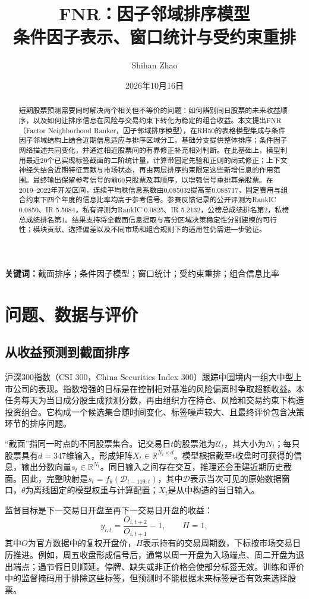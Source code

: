 \documentclass[UTF8,11pt,a4paper,fontset=fandol]{ctexart}
\title{\bfseries FNR：因子邻域排序模型\\[0.35em]\large 条件因子表示、窗口统计与受约束重排}
\author{Shihan Zhao}
\date{2026年10月16日}
\makeatletter
\renewcommand{\maketitle}{%
  \thispagestyle{plain}%
  \begin{center}
    {\LARGE\@title\par}\vspace{.65em}
    {\normalsize\@author\par}\vspace{.35em}
    {\small\@date\par}
  \end{center}\vspace{.5em}%
}
\newcommand{\R}{\mathbb{R}}
\makeatother
\begin{document}
\maketitle
\begin{abstract}
短期股票预测需要同时解决两个相关但不等价的问题：如何辨别同日股票的未来收益顺序，以及如何让排序信息在风险与交易约束下转化为稳定的组合收益。本文提出FNR（Factor Neighborhood Ranker，因子邻域排序模型），在RH50的表格模型集成与条件因子邻域结构上结合近期信息适应与排序区域分工。基础分支提供整体排序；条件因子网络描述共同变化，并通过相近股票间的有界修正补充相对判断。在此基础上，模型利用最近20个已实现标签截面的二阶统计量，计算带固定先验和正则的闭式修正；上下文神经头结合近期特征贡献与市场状态，再由两层排序约束限定这些新增信息的作用范围。最终输出保留参考信号的前60只股票及其顺序，以增强信号重排其余股票。在2019--2022年开发区间，连续平均秩信息系数由0.085032提高至0.088717，固定费用与组合约束下四个年度的信息比率均高于参考信号。参赛反馈记录的公开评测为RankIC 0.0850、IR 5.5684，私有评测为RankIC 0.0825、IR 5.2132，公榜总成绩排名第2，私榜总成绩排名第1。结果支持将全截面信息提取与高分区域决策稳定性分别建模的可行性；模块贡献、选择偏差以及不同市场和组合规则下的适用性仍需进一步验证。
\end{abstract}
\noindent\textbf{关键词：}截面排序；条件因子模型；窗口统计；受约束重排；组合信息比率

\section{问题、数据与评价}
\subsection{从收益预测到截面排序}
沪深300指数（CSI 300，China Securities Index 300）跟踪中国境内一组大中型上市公司的表现。指数增强的目标是在控制相对基准的风险偏离时争取超额收益。本任务每天为当日成分股生成预测分数，再由组织方在持仓、风险和交易约束下构造投资组合\cite{competition}。它构成一个候选集合随时间变化、标签噪声较大、且最终评价包含决策环节的排序问题。

“截面”指同一时点的不同股票集合。记交易日$t$的股票池为$\mathcal U_t$，其大小为$N_t$；每只股票具有$d=347$维输入，形成矩阵$X_t\in\R^{N_t\times d}$。模型根据截至$t$收盘时可获得的信息，输出分数向量$s_t\in\R^{N_t}$。同日输入之间存在交互，推理还会重建近期历史截面。因此，完整映射是$s_t=f_\theta(\mathcal D_{t-119:t})$，其中$\mathcal D$表示当次可见的原始数据窗口，$\theta$为离线固定的模型权重与计算配置；$X_t$是从中构造的当日输入。

监督目标是下一交易日开盘至再下一交易日开盘的收益：
\begin{equation}
 y_{i,t}=\frac{O_{i,t+2}}{O_{i,t+1}}-1,\qquad H=1,
 \label{eq:label}
\end{equation}
其中$O$为官方数据中的复权开盘价，$H$表示持有的交易周期数，下标按市场交易日历推进。例如，周五收盘形成信号后，通常以周一开盘为入场端点、周二开盘为退出端点；遇节假日则顺延。停牌、缺失或非正价格会使部分标签无效。训练和评价中的监督掩码用于排除这些标签，但预测时不能根据未来标签是否有效来选择股票。
\end{document}
